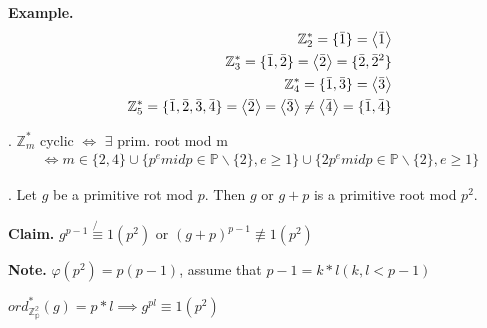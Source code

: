 \textbf{Example.}
\begin{align*}
  \mathbb{Z}_2^{*} = \{\bar{1}\} = \left\langle \bar{1} \right\rangle \\
  \mathbb{Z}_3^{*} = \{\bar{1}, \bar{2}\} = \left\langle \bar{2} \right\rangle 
    = \{\bar{2}, \bar{2}^2 \}\\
  \mathbb{Z}_4^{*} = \{\bar{1}, \bar{3}\} = \left\langle \bar{3} \right\rangle \\
  \mathbb{Z}_5^{*} = \{\bar{1}, \bar{2}, \bar{3}, \bar{4}\} 
    = \left\langle \bar{2} \right\rangle = \left\langle \bar{3} \right\rangle \neq \left\langle \bar{4} \right\rangle
    = \{\bar{1}, \bar{4}\} \\
\end{align*}


\Theorem.
$\mathbb{Z}_m^{*}$ cyclic $\Leftrightarrow$ $\exists$ prim. root mod m 
\begin{align*}
  \Leftrightarrow 
    m \in \{2,4\} \cup \{ p^e mid p \in \mathbb{P} \backslash \{2\}, e \geq 1 \} \cup \{ 2p^e mid p \in \mathbb{P} \backslash \{2\}, e \geq 1 \}
\end{align*}

\Proof.
Let $g$ be a primitive rot mod $p$. Then $g$ or $g+p$ is a primitive root mod $p^2$.


\textbf{Claim.}
$g^{p-1} \not{\equiv} 1 (p^2)$ or $(g+p)^{p-1} \not\equiv 1 (p^2)$

\textbf{Note.}
$\varphi(p^2) = p(p-1)$, assume that $p-1 = k*l (k, l < p-1)$

$ord_{\mathbb{Z_p^2}}^{*}(g) = p*l \implies g^{pl} \equiv 1 (p^2)$



